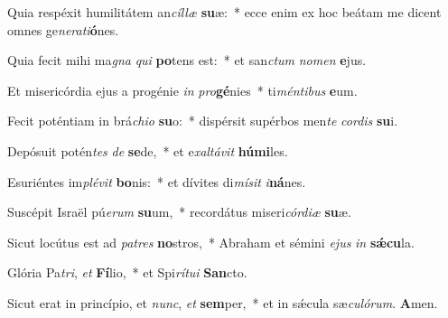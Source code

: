 ﻿\setcounter{enumi}{2}
\item Quia respéxit humilitátem an\textit{cíl}\textit{læ} \textbf{su}æ:~* ecce enim ex hoc beátam me dicent omnes ge\textit{ne}\textit{ra}\textit{ti}\textbf{ó}nes.

\item Quia fecit mihi ma\textit{gna} \textit{qui} \textbf{po}tens est:~* et san\textit{ctum} \textit{no}\textit{men} \textbf{e}jus.

\item Et misericórdia ejus a progénie \textit{in} \textit{pro}\textbf{gé}nies~* ti\textit{mén}\textit{ti}\textit{bus} \textbf{e}um.

\item Fecit poténtiam in brá\textit{chi}\textit{o} \textbf{su}o:~* dispérsit supérbos men\textit{te} \textit{cor}\textit{dis} \textbf{su}i.

\item Depósuit potén\textit{tes} \textit{de} \textbf{se}de,~* et e\textit{xal}\textit{tá}\textit{vit} \textbf{hú}\textbf{mi}les.

\item Esuriéntes im\textit{plé}\textit{vit} \textbf{bo}nis:~* et dívites di\textit{mí}\textit{sit} \textit{i}\textbf{ná}nes.

\item Suscépit Israël pú\textit{e}\textit{rum} \textbf{su}um,~* recordátus miseri\textit{cór}\textit{di}\textit{æ} \textbf{su}æ.

\item Sicut locútus est ad \textit{pa}\textit{tres} \textbf{no}stros,~* Abraham et sémini \textit{e}\textit{jus} \textit{in} \textbf{sǽ}\textbf{cu}la.

\item Glória Pa\textit{tri}, \textit{et} \textbf{Fí}lio,~* et Spi\textit{rí}\textit{tu}\textit{i} \textbf{San}cto.

\item Sicut erat in princípio, et \textit{nunc}, \textit{et} \textbf{sem}per,~* et in sǽcula sæ\textit{cu}\textit{ló}\textit{rum}. \textbf{A}men.